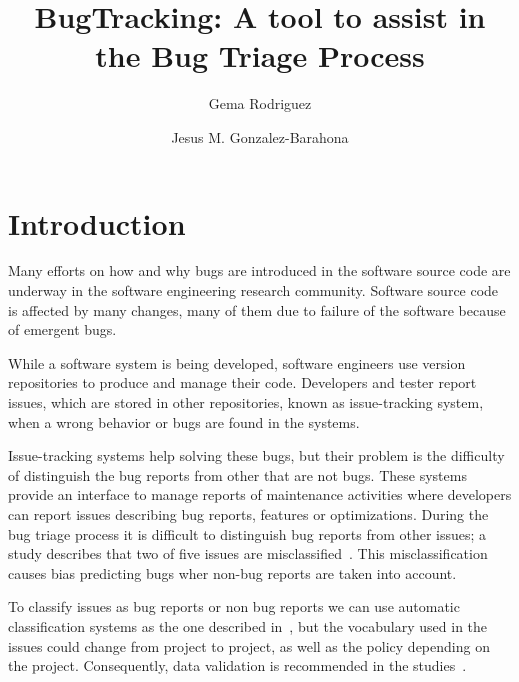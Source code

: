 \documentclass[ifip]{svmult}
\begin{document}
\title*{BugTracking: A tool to assist in the Bug Triage Process}
\author{Gema Rodriguez\and Jesus M. Gonzalez-Barahona}
%
%
\maketitle
\section{Introduction} 
\label{sec:1}

Many efforts on how and why bugs are introduced in the software source code are underway in the software engineering research community. Software source code is affected by many changes, many of them due to failure of the software because of emergent bugs. 

While a software system is being developed, software engineers use version repositories to produce and manage their code. Developers and tester report issues, which are stored in other repositories, known as issue-tracking system, when a wrong behavior or bugs are found in the systems.

Issue-tracking systems help solving these bugs, but their problem is the difficulty of distinguish the bug reports from other that are not bugs. These systems provide an interface to manage reports of maintenance activities where developers can report issues describing bug reports, features or optimizations. During the bug triage process it is difficult to distinguish bug reports from other issues; a study describes that two of five issues are misclassified~\cite{Herzig}. This misclassification causes bias predicting bugs wher non-bug reports are taken into account.

To classify issues as bug reports or non bug reports we can use automatic classification systems as the one described in~\cite{Antoniol}, but the vocabulary used in the issues could change from project to project, as well as the policy depending on the project. Consequently, data validation is recommended in the studies~\cite{Herzig}. 
\end{document}
